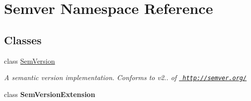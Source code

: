 \hypertarget{namespace_semver}{}\section{Semver Namespace Reference}
\label{namespace_semver}
\subsection*{Classes}
\begin{DoxyCompactItemize}
\item 
class \mbox{\hyperlink{class_semver_1_1_sem_version}{Sem\+Version}}
\begin{DoxyCompactList}\small\item\em A semantic version implementation. Conforms to v2.. of \href{http://semver.org/}{\texttt{ http\+://semver.\+org/}} \end{DoxyCompactList}\item 
class {\bfseries Sem\+Version\+Extension}
\end{DoxyCompactItemize}
